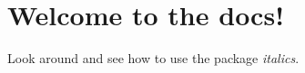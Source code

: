 \chapter{Welcome to the docs! }
\hypertarget{index}{}\label{index}
\label{index_mainpage}%
%


Look around and see how to use the package {\itshape italics}. 